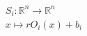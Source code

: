 \documentclass[preview]{standalone}
\begin{document}
\begin{align*}
S_i : \mathbb{R}^n \to \mathbb{R}^n \\ x \mapsto r O_i(x) + b_i \\
\end{align*}
\end{document}
